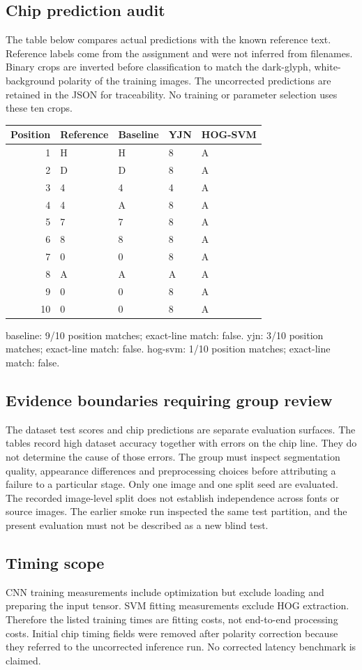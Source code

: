 \subsection{Chip prediction audit}
The table below compares actual predictions with the known reference text.
Reference labels come from the assignment and were not inferred from filenames.
Binary crops are inverted before classification to match the dark-glyph,
white-background polarity of the training images. The uncorrected predictions
are retained in the JSON for traceability. No training or parameter selection
uses these ten crops.
\begin{center}\begin{tabular}{rllll}\toprule
Position & Reference & Baseline & YJN & HOG-SVM \\ \midrule
1 & H & H & 8 & A \\
2 & D & D & 8 & A \\
3 & 4 & 4 & 4 & A \\
4 & 4 & A & 8 & A \\
5 & 7 & 7 & 8 & A \\
6 & 8 & 8 & 8 & A \\
7 & 0 & 0 & 8 & A \\
8 & A & A & A & A \\
9 & 0 & 0 & 8 & A \\
10 & 0 & 0 & 8 & A \\
\bottomrule\end{tabular}\end{center}
baseline: 9/10 position matches; exact-line match: false. yjn: 3/10 position matches; exact-line match: false. hog-svm: 1/10 position matches; exact-line match: false. 

\subsection{Evidence boundaries requiring group review}
The dataset test scores and chip predictions are separate evaluation surfaces.
The tables record high dataset accuracy together with errors on the chip line.
They do not determine the cause of those errors. The group must inspect
segmentation quality, appearance differences and preprocessing choices before
attributing a failure to a particular stage. Only one image and one split seed
are evaluated. The recorded image-level split does not establish independence
across fonts or source images. The earlier smoke run inspected the same test
partition, and the present evaluation must not be described as a new blind test.

\subsection{Timing scope}
CNN training measurements include optimization but exclude loading and
preparing the input tensor. SVM fitting measurements exclude HOG extraction.
Therefore the listed training times are fitting costs, not end-to-end processing
costs. Initial chip timing fields were removed after polarity correction because
they referred to the uncorrected inference run. No corrected latency benchmark
is claimed.
